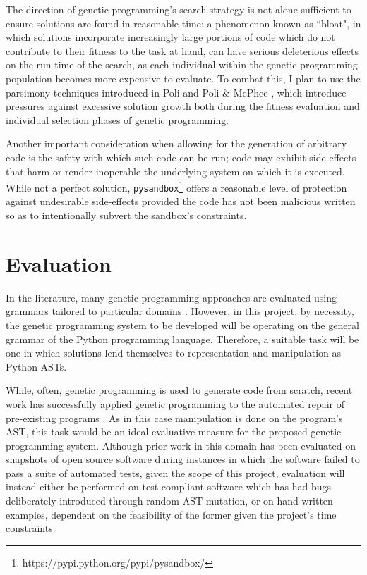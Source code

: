 \documentclass[a4paper,11pt]{proposal}
\begin{document}
The direction of genetic programming's search strategy is not alone sufficient to ensure solutions are found in reasonable time: a phenomenon known as ``bloat", in which solutions incorporate increasingly large portions of code which do not contribute to their fitness to the task at hand, can have serious deleterious effects on the run-time of the search, as each individual within the genetic programming population becomes more expensive to evaluate. To combat this, I plan to use the parsimony techniques introduced in Poli \cite{poli2003} and Poli \& McPhee \cite{poli2008}, which introduce pressures against excessive solution growth both during the fitness evaluation and individual selection phases of genetic programming.

Another important consideration when allowing for the generation of arbitrary code is the safety with which such code can be run; code may exhibit side-effects that harm or render inoperable the underlying system on which it is executed. While not a perfect solution, \texttt{pysandbox}\footnote{https://pypi.python.org/pypi/pysandbox/} offers a reasonable level of protection against undesirable side-effects provided the code has not been malicious written so as to intentionally subvert the sandbox's constraints. 


\section{Evaluation}

In the literature, many genetic programming approaches are evaluated using grammars tailored to particular domains \cite{mcdermott2012}. However, in this project, by necessity, the genetic programming system to be developed will be operating on the general grammar of the Python programming language. Therefore, a suitable task will be one in which solutions lend themselves to representation and manipulation as Python ASTs.

While, often, genetic programming is used to generate code from scratch, recent work has successfully applied genetic programming to the automated repair of pre-existing programs \cite{weimer2009}. As in this case manipulation is done on the program's AST, this task would be an ideal evaluative measure for the proposed genetic programming system. Although prior work in this domain has been evaluated on snapshots of open source software during instances in which the software failed to pass a suite of automated tests, given the scope of this project, evaluation will instead either be performed on test-compliant software which has had bugs deliberately introduced through random AST mutation, or on hand-written examples, dependent on the feasibility of the former given the project's time constraints.
\end{document}

